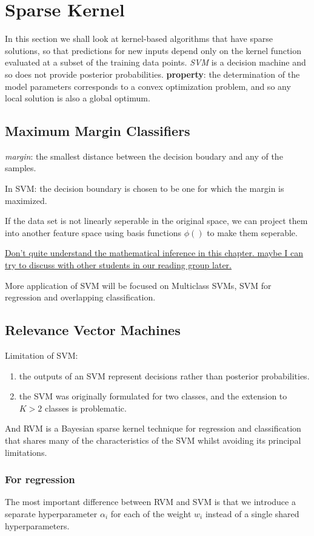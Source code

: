 \documentclass[a4paper]{book}
\begin{document}
\section{Sparse Kernel}
In this section we shall look at kernel-based algorithms that have sparse solutions, so that predictions for new inputs depend only on the kernel function evaluated at a subset of the training data points.\newline
\textit{SVM} is a decision machine and so does not provide posterior probabilities.
\textbf{property}: the  determination of the model parameters corresponds to a convex optimization problem, and so any local solution is also a global optimum.
\subsection{Maximum Margin Classifiers}
\textit{margin}: the smallest distance between the decision boudary and any of the samples.

In SVM: the decision boundary is chosen to be one for which the margin is maximized.

If the data set is not linearly seperable in the original space, we can project them into another feature space using basis functions $\phi()$  to make them seperable.

\uline{Don't quite understand the mathematical inference in this chapter.  maybe I can try to discuss with other students in our reading group later.}

More application of SVM will be focused on Multiclass SVMs, SVM for regression and overlapping classification.
\subsection{Relevance Vector Machines}
Limitation of SVM:
\begin{enumerate}
  \item the outputs of an SVM represent decisions rather than posterior probabilities.
  \item  the SVM was originally formulated for two classes, and the extension to $K > 2$ classes is problematic.
\end{enumerate}

And RVM is a Bayesian sparse kernel technique for regression and classification that shares many of the characteristics of the SVM whilst avoiding its principal limitations.

\subsubsection{For regression}
The most important difference between RVM and SVM is that we introduce a separate hyperparameter $\alpha_i$ for each of the weight $w_i$ instead of a single shared hyperparameters.
\end{document}
